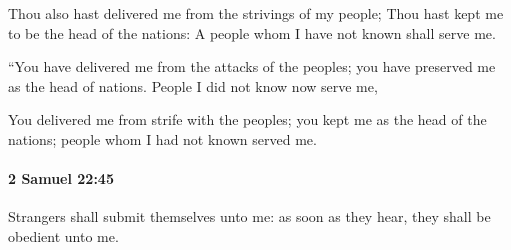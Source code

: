			\begin{versebox}
					\item[BHS] 
					\item[ASV] Thou also hast delivered me from the strivings of my people; Thou hast kept me to be the head of the nations: A people whom I have not known shall serve me.
					\item[NIV] “You have delivered me from the attacks of the peoples; you have preserved me as the head of nations. People I did not know now serve me,
					\item[NRSV] You delivered me from strife with the peoples; you kept me as the head of the nations; people whom I had not known served me.
			\end{versebox}

		\paragraph{2 Samuel 22:45} %
			\label{2SAMUEL-22-45}

			Strangers shall submit themselves unto me: as soon as they hear, they shall be obedient unto me.

